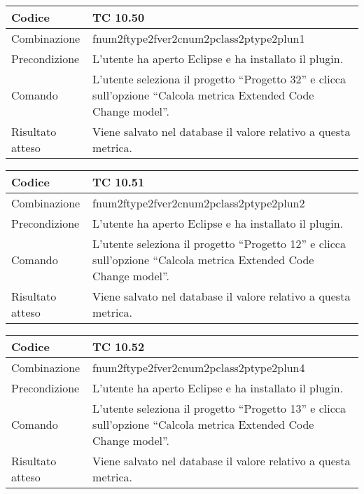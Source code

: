 \begin{table}[ht]
\begin{tabular}{|p{3cm}|p{9cm}|}
\hline
\cellcolor{lightgray}Codice				& TC 10.50								\\
\hline
\cellcolor{lightgray}Combinazione		& fnum2ftype2fver2cnum2pclass2ptype2plun1									\\
\hline
\cellcolor{lightgray}Precondizione		& L'utente ha aperto Eclipse e ha installato il plugin.		\\
\hline
\cellcolor{lightgray}Comando			& L'utente seleziona il progetto ``Progetto 32''  e clicca sull'opzione ``Calcola metrica Extended Code Change model''.	\\
\hline
\cellcolor{lightgray}Risultato atteso	& Viene salvato nel database il valore relativo a questa metrica.\\
\hline
\end{tabular}
\end{table}

\begin{table}[ht]
\begin{tabular}{|p{3cm}|p{9cm}|}
\hline
\cellcolor{lightgray}Codice				& TC 10.51								\\
\hline
\cellcolor{lightgray}Combinazione		& fnum2ftype2fver2cnum2pclass2ptype2plun2									\\
\hline
\cellcolor{lightgray}Precondizione		& L'utente ha aperto Eclipse e ha installato il plugin.		\\
\hline
\cellcolor{lightgray}Comando			& L'utente seleziona il progetto ``Progetto 12''  e clicca sull'opzione ``Calcola metrica Extended Code Change model''.	\\
\hline
\cellcolor{lightgray}Risultato atteso	& Viene salvato nel database il valore relativo a questa metrica.\\
\hline
\end{tabular}
\end{table}

\begin{table}[ht]
\begin{tabular}{|p{3cm}|p{9cm}|}
\hline
\cellcolor{lightgray}Codice				& TC 10.52								\\
\hline
\cellcolor{lightgray}Combinazione		& fnum2ftype2fver2cnum2pclass2ptype2plun4									\\
\hline
\cellcolor{lightgray}Precondizione		& L'utente ha aperto Eclipse e ha installato il plugin.		\\
\hline
\cellcolor{lightgray}Comando			& L'utente seleziona il progetto ``Progetto 13''  e clicca sull'opzione ``Calcola metrica Extended Code Change model''.	\\
\hline
\cellcolor{lightgray}Risultato atteso	& Viene salvato nel database il valore relativo a questa metrica.\\
\hline
\end{tabular}
\end{table}

